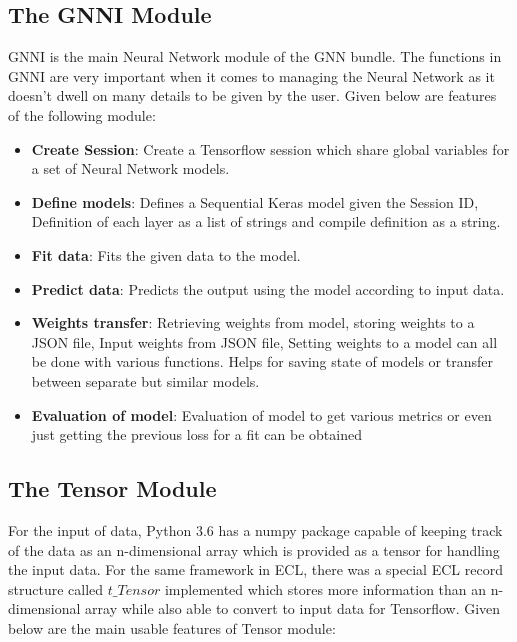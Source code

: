 \documentclass[conference]{IEEEtran}
\begin{document}
\subsection{The GNNI Module}

GNNI is the main Neural Network module of the GNN bundle. The functions in GNNI are very important when it comes to managing the Neural Network as it doesn't dwell on many details to be given by the user. Given below are features of the following module:

\begin{itemize}
    \item \textbf{Create Session}: Create a Tensorflow session which share global variables for a set of Neural Network models.
    \item \textbf{Define models}: Defines a Sequential Keras model given the Session ID, Definition of each layer as a list of strings and compile definition as a string.
    \item \textbf{Fit data}: Fits the given data to the model.
    \item \textbf{Predict data}: Predicts the output using the model according to input data.
    \item \textbf{Weights transfer}: Retrieving weights from model, storing weights to a JSON file, Input weights from JSON file, Setting weights to a model can all be done with various functions. Helps for saving state of models or transfer between separate but similar models.
    \item \textbf{Evaluation of model}: Evaluation of model to get various metrics or even just getting the previous loss for a fit can be obtained
\end{itemize}

\subsection{The Tensor Module}

For the input of data, Python 3.6 has a numpy package capable of keeping track of the data as an n-dimensional array which is provided as a tensor for handling the input data. For the same framework in ECL, there was a special ECL record structure called $t\_Tensor$ implemented which stores more information than an n-dimensional array while also able to convert to input data for Tensorflow. Given below are the main usable features of Tensor module:
\end{document}
